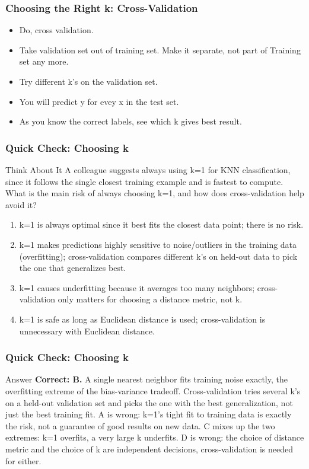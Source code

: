 \begin{frame}[fragile] \frametitle{Choosing the Right k: Cross-Validation}
\begin{itemize}
\item Do, cross validation.
\item Take validation set out of training set. Make it separate, not part of Training set any more.
\item Try different k's on the validation set.
\item You will predict y for evey x in the test set.
\item As you know the correct labels, see which k gives best result.
\end{itemize}
\end{frame}

\begin{frame}[fragile]\frametitle{Quick Check: Choosing k}
\begin{block}{Think About It}
A colleague suggests always using k=1 for KNN classification, since it follows the single
closest training example and is fastest to compute. What is the main risk of always
choosing k=1, and how does cross-validation help avoid it?
\begin{enumerate}
  \item[A.] k=1 is always optimal since it best fits the closest data point; there is no risk.
  \item[B.] k=1 makes predictions highly sensitive to noise/outliers in the training data
  (overfitting); cross-validation compares different k's on held-out data to pick the one
  that generalizes best.
  \item[C.] k=1 causes underfitting because it averages too many neighbors; cross-validation
  only matters for choosing a distance metric, not k.
  \item[D.] k=1 is safe as long as Euclidean distance is used; cross-validation is unnecessary
  with Euclidean distance.
\end{enumerate}
\end{block}
\end{frame}

\begin{frame}[fragile]\frametitle{Quick Check: Choosing k}
\begin{block}{Answer}
\textbf{Correct: B.} A single nearest neighbor fits training noise exactly, the overfitting
extreme of the bias-variance tradeoff. Cross-validation tries several k's on a held-out
validation set and picks the one with the best generalization, not just the best training
fit. A is wrong: k=1's tight fit to training data is exactly the risk, not a guarantee of
good results on new data. C mixes up the two extremes: k=1 overfits, a very large k
underfits. D is wrong: the choice of distance metric and the choice of k are independent
decisions, cross-validation is needed for either.
\end{block}
\end{frame}

